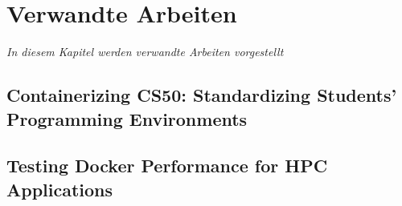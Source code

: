 \chapter{Verwandte Arbeiten}
\label{cha:related-work}
\textit{In diesem Kapitel werden verwandte Arbeiten vorgestellt}

\section{Containerizing CS50: Standardizing Students' Programming Environments \cite{malanContainerizingCS50Standardizing2024}}



\section{Testing Docker Performance for HPC Applications \cite{ermakovTestingDockerPerformance2017}}

\section{}
